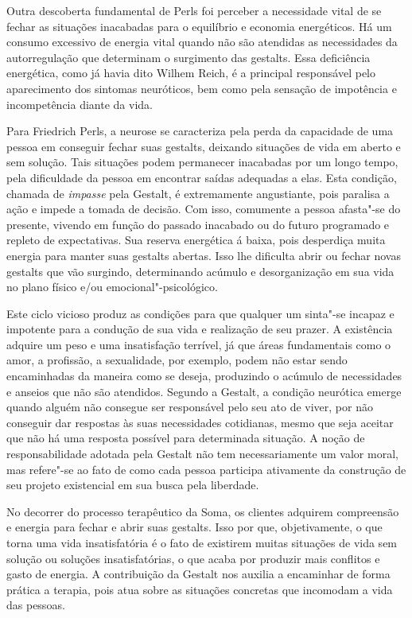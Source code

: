 Outra descoberta fundamental de Perls foi perceber a necessidade vital
de se fechar as situações inacabadas para o equilíbrio e economia
energéticos. Há um consumo excessivo de energia vital quando não são
atendidas as necessidades da autorregulação que determinam o surgimento
das gestalts. Essa deficiência energética, como já havia dito Wilhem
Reich, é a principal responsável pelo aparecimento dos sintomas
neuróticos, bem como pela sensação de impotência e incompetência diante
da vida.

Para Friedrich Perls, a neurose se caracteriza pela perda da capacidade
de uma pessoa em conseguir fechar suas gestalts, deixando situações de
vida em aberto e sem solução. Tais situações podem permanecer inacabadas
por um longo tempo, pela dificuldade da pessoa em encontrar saídas
adequadas a elas. Esta condição, chamada de \emph{impasse} pela Gestalt,
é extremamente angustiante, pois paralisa a ação e impede a tomada de
decisão. Com isso, comumente a pessoa afasta"-se do presente, vivendo em
função do passado inacabado ou do futuro programado e repleto de
expectativas. Sua reserva energética á baixa, pois desperdiça muita
energia para manter suas gestalts abertas. Isso lhe dificulta abrir ou
fechar novas gestalts que vão surgindo, determinando acúmulo e
desorganização em sua vida no plano físico e/ou emocional"-psicológico.

Este ciclo vicioso produz as condições para que qualquer um sinta"-se
incapaz e impotente para a condução de sua vida e realização de seu
prazer. A existência adquire um peso e uma insatisfação terrível, já que
áreas fundamentais como o amor, a profissão, a sexualidade, por exemplo,
podem não estar sendo encaminhadas da maneira como se deseja, produzindo
o acúmulo de necessidades e anseios que não são atendidos. Segundo a
Gestalt, a condição neurótica emerge quando alguém não consegue ser
responsável pelo seu ato de viver, por não conseguir dar respostas às
suas necessidades cotidianas, mesmo que seja aceitar que não há uma
resposta possível para determinada situação. A noção de responsabilidade
adotada pela Gestalt não tem necessariamente um valor moral, mas
refere"-se ao fato de como cada pessoa participa ativamente da construção
de seu projeto existencial em sua busca pela liberdade.

No decorrer do processo terapêutico da Soma, os clientes adquirem
compreensão e energia para fechar e abrir suas gestalts. Isso por que,
objetivamente, o que torna uma vida insatisfatória é o fato de existirem
muitas situações de vida sem solução ou soluções insatisfatórias, o que
acaba por produzir mais conflitos e gasto de energia. A contribuição da
Gestalt nos auxilia a encaminhar de forma prática a terapia, pois atua
sobre as situações concretas que incomodam a vida das pessoas.

